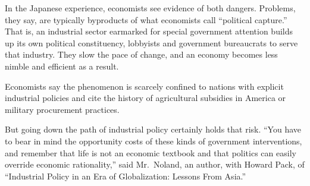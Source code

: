 \documentclass[12pt,a4paper,onecolumn]{article}
\begin{document}
In the Japanese experience, economists see evidence of both dangers. Problems, they say, are
typically byproducts of what economists call ``political capture.'' That is, an industrial sector
earmarked for special government attention builds up its own political constituency, lobbyists and
government bureaucrats to serve that industry. They slow the pace of change, and an economy becomes
less nimble and efficient as a result.

Economists say the phenomenon is scarcely confined to nations with explicit industrial policies and
cite the history of agricultural subsidies in America or military procurement practices.

But going down the path of industrial policy certainly holds that risk. ``You have to bear in mind
the opportunity costs of these kinds of government interventions, and remember that life is not an
economic textbook and that politics can easily override economic rationality,'' said Mr.~Noland, an
author, with Howard Pack, of ``Industrial Policy in an Era of Globalization: Lessons From Asia.''
\end{document}
